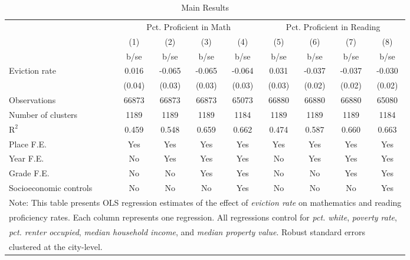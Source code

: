 \begin{table}[htbp]\centering
\def\sym#1{\ifmmode^{#1}\else\(^{#1}\)\fi}
\caption{Main Results}
\begin{tabular}{l*{8}{c}}
\toprule
                    &\multicolumn{4}{c}{Pct. Proficient in Math}        &\multicolumn{4}{c}{Pct. Proficient in Reading}     \\\cmidrule(lr){2-5}\cmidrule(lr){6-9}
                    &\multicolumn{1}{c}{(1)}&\multicolumn{1}{c}{(2)}&\multicolumn{1}{c}{(3)}&\multicolumn{1}{c}{(4)}&\multicolumn{1}{c}{(5)}&\multicolumn{1}{c}{(6)}&\multicolumn{1}{c}{(7)}&\multicolumn{1}{c}{(8)}\\
                    &        b/se&        b/se&        b/se&        b/se&        b/se&        b/se&        b/se&        b/se\\
\midrule
Eviction rate       &       0.016&      -0.065&      -0.065&      -0.064&       0.031&      -0.037&      -0.037&      -0.030\\
                    &      (0.04)&      (0.03)&      (0.03)&      (0.03)&      (0.03)&      (0.02)&      (0.02)&      (0.02)\\
\midrule
Observations        &       66873&       66873&       66873&       65073&       66880&       66880&       66880&       65080\\
Number of clusters  &        1189&        1189&        1189&        1184&        1189&        1189&        1189&        1184\\
$\text{R}^2$        &       0.459&       0.548&       0.659&       0.662&       0.474&       0.587&       0.660&       0.663\\
Place F.E.          &         Yes&         Yes&         Yes&         Yes&         Yes&         Yes&         Yes&         Yes\\
Year F.E.           &          No&         Yes&         Yes&         Yes&          No&         Yes&         Yes&         Yes\\
Grade F.E.          &          No&          No&         Yes&         Yes&          No&          No&         Yes&         Yes\\
Socioeconomic controls&          No&          No&          No&         Yes&          No&          No&          No&         Yes\\
\bottomrule
\multicolumn{9}{l}{\footnotesize Note: This table presents OLS regression estimates of the effect of \emph{eviction rate} on mathematics and reading}\\
\multicolumn{9}{l}{\footnotesize proficiency rates. Each column represents one regression. All regressions control for \emph{pct. white}, \emph{poverty rate},}\\
\multicolumn{9}{l}{\footnotesize \emph{pct. renter occupied}, \emph{median household income}, and \emph{median property value}. Robust standard errors}\\
\multicolumn{9}{l}{\footnotesize clustered at the city-level.}\\
\end{tabular}
\end{table}
